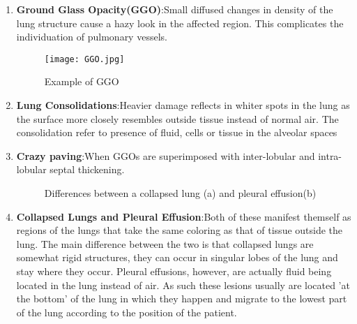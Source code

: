 \begin{enumerate}
        \item \textbf{Ground Glass Opacity(GGO)}:\newline Small diffused changes in density of the lung structure cause a hazy look in the affected region. This complicates the individuation of pulmonary vessels.
			\begin{figure}[htbp]
				\centering
				\texttt{[image: GGO.jpg]}
				\caption{Example of GGO\label{GGOImage}}
			\end{figure}
        \item \textbf{Lung Consolidations}:\newline Heavier damage reflects in whiter spots in the lung as the surface more closely resembles outside tissue instead of normal air. The consolidation refer to presence of fluid, cells or tissue in the alveolar spaces	
        \item \textbf{Crazy paving}:\newline When GGOs are superimposed with inter-lobular and intra-lobular septal thickening.
			\begin{figure}[htbp]
				\centering
				\caption{Differences between a collapsed lung (a) and pleural effusion(b)}
			\end{figure}
	\item \textbf{Collapsed Lungs and Pleural Effusion}:\newline Both of these manifest themself as regions of the lungs that take the same coloring as that of tissue outside the lung. The main difference between the two is that collapsed lungs are somewhat rigid structures, they can occur in singular lobes of the lung and stay where they occur. Pleural effusions, however, are actually fluid being located in the lung instead of air. As such these lesions usually are located 'at the bottom' of the lung in which they happen and migrate to the lowest part of the lung according to the position of the patient.
\end{enumerate}

